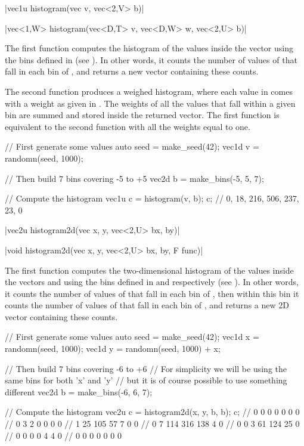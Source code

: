 \funcitem \cppinline|vec1u histogram(vec v, vec<2,V> b)| 

\cppinline|vec<1,W> histogram(vec<D,T> v, vec<D,W> w, vec<2,U> b)|

The first  function computes the histogram of the values inside the vector  using the bins defined in  (see ). In other words, it counts the number of values of  that fall in each bin of , and returns a new vector containing these counts.

The second  function produces a weighed histogram, where each value in  comes with a weight as given in . The weights of all the values that fall within a given bin are summed and stored inside the returned vector. The first function is equivalent to the second function with all the weights equal to one.

\begin{example}
\begin{cppcode}
// First generate some values
auto seed = make_seed(42);
vec1d v = randomn(seed, 1000);

// Then build 7 bins covering -5 to +5
vec2d b = make_bins(-5, 5, 7);

// Compute the histogram
vec1u c = histogram(v, b);
c; // {0, 18, 216, 506, 237, 23, 0}
\end{cppcode}
\end{example}

\funcitem \cppinline|vec2u histogram2d(vec x, y, vec<2,U> bx, by)| 

\cppinline|void histogram2d(vec x, y, vec<2,U> bx, by, F func)|

The first  function computes the two-dimensional histogram of the values inside the vectors  and  using the bins defined in  and  respectively (see ). In other words, it counts the number of values of  that fall in each bin of , then within this bin it counts the number of values of  that fall in each bin of , and returns a new 2D vector containing these counts.

\begin{example}
\begin{cppcode}
// First generate some values
auto seed = make_seed(42);
vec1d x = randomn(seed, 1000);
vec1d y = randomn(seed, 1000) + x;

// Then build 7 bins covering -6 to +6
// For simplicity we will be using the same bins for both 'x' and 'y'
// but it is of course possible to use something different
vec2d b = make_bins(-6, 6, 7);

// Compute the histogram
vec2u c = histogram2d(x, y, b, b);
c;
//   0   0   0   0   0   0   0
//   0   3   2   0   0   0   0
//   1   25  105 57  7   0   0
//   0   7   114 316 138 4   0
//   0   0   3   61  124 25  0
//   0   0   0   0   4   4   0
//   0   0   0   0   0   0   0
\end{cppcode}
\end{example}

